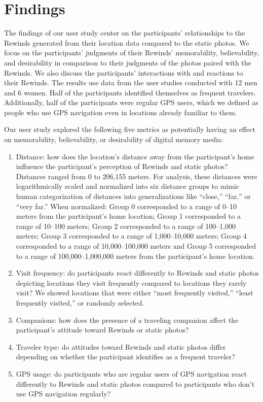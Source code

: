 \documentclass{sigchi}
\begin{document}
\section{Findings}
The findings of our user study center on the participants’ relationships to the Rewinds generated from their location data compared to the static photos. We focus on the participants’ judgments of their Rewinds’ memorability, believability, and desirability in comparison to their judgments of the photos paired with the Rewinds. We also discuss the participants' interactions with and reactions to their Rewinds. The results use data from the user studies conducted with 12 men and 6 women. Half of the participants identified themselves as frequent travelers. Additionally, half of the participants were regular GPS users, which we defined as people who use GPS navigation even in locations already familiar to them.

Our user study explored the following five metrics as potentially having an effect on memorability, believability, or desirability of digital memory media:
\begin{enumerate}
	\item Distance: how does the location's distance away from the participant's home influence the participant's perception of Rewinds and static photos? Distances ranged from 0 to 206,155 meters. For analysis, these distances were logarithmically scaled and normalized into six distance groups to mimic human categorization of distances into generalizations like ``close,'' ``far,'' or ``very far.'' When normalized: Group 0 corresponded to a range of 0--10 meters from the participant's home location; Group 1 corresponded to a range of 10--100 meters; Group 2 corresponded to a range of 100--1,000 meters; Group 3 corresponded to a range of 1,000--10,000 meters; Group 4 corresponded to a range of 10,000--100,000 meters and Group 5 corresponded to a range of 100,000--1,000,000 meters from the participant's home location.  
	\item Visit frequency: do participants react differently to Rewinds and static photos depicting locations they visit frequently compared to locations they rarely visit? We showed locations that were either ``most frequently visited,'' ``least frequently visited,'' or randomly selected.
	\item Companions: how does the presence of a traveling companion affect the participant's attitude toward Rewinds or static photos?
	\item Traveler type: do attitudes toward Rewinds and static photos differ depending on whether the participant identifies as a frequent traveler?
	\item GPS usage: do participants who are regular users of GPS navigation react differently to Rewinds and static photos compared to participants who don't use GPS navigation regularly?
\end{enumerate}
\end{document}
